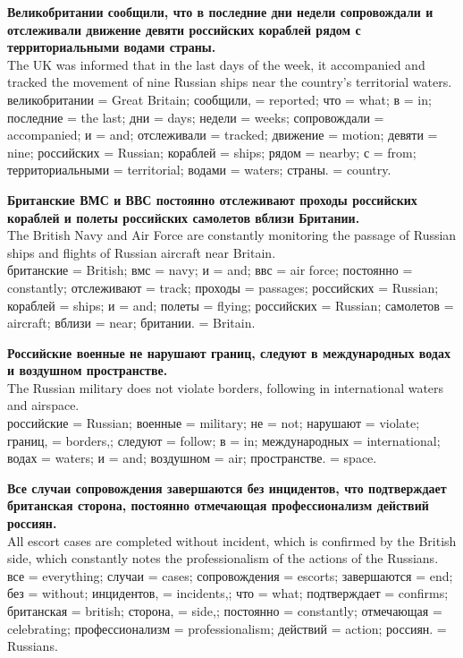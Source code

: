 {\bf Великобритании сообщили, что в последние дни недели сопровождали и отслеживали движение девяти российских кораблей рядом с территориальными водами страны. }\\
The UK was informed that in the last days of the week, it accompanied and tracked the movement of nine Russian ships near the country's territorial waters.\\
{\color{darkgreen} великобритании = Great Britain; сообщили, = reported; что = what; в = in; последние = the last; дни = days; недели = weeks; сопровождали = accompanied; и = and; отслеживали = tracked; движение = motion; девяти = nine; российских = Russian; кораблей = ships; рядом = nearby; с = from; территориальными = territorial; водами = waters; страны. = country.}

{\bf Британские ВМС и ВВС постоянно отслеживают проходы российских кораблей и полеты российских самолетов вблизи Британии. }\\
The British Navy and Air Force are constantly monitoring the passage of Russian ships and flights of Russian aircraft near Britain.\\
{\color{darkgreen} британские = British; вмс = navy; и = and; ввс = air force; постоянно = constantly; отслеживают = track; проходы = passages; российских = Russian; кораблей = ships; и = and; полеты = flying; российских = Russian; самолетов = aircraft; вблизи = near; британии. = Britain.}

{\bf Российские военные не нарушают границ, следуют в международных водах и воздушном пространстве. }\\
The Russian military does not violate borders, following in international waters and airspace.\\
{\color{darkgreen} российские = Russian; военные = military; не = not; нарушают = violate; границ, = borders,; следуют = follow; в = in; международных = international; водах = waters; и = and; воздушном = air; пространстве. = space.}

{\bf Все случаи сопровождения завершаются без инцидентов, что подтверждает британская сторона, постоянно отмечающая профессионализм действий россиян. }\\
All escort cases are completed without incident, which is confirmed by the British side, which constantly notes the professionalism of the actions of the Russians.\\
{\color{darkgreen} все = everything; случаи = cases; сопровождения = escorts; завершаются = end; без = without; инцидентов, = incidents,; что = what; подтверждает = confirms; британская = british; сторона, = side,; постоянно = constantly; отмечающая = celebrating; профессионализм = professionalism; действий = action; россиян. = Russians.}

